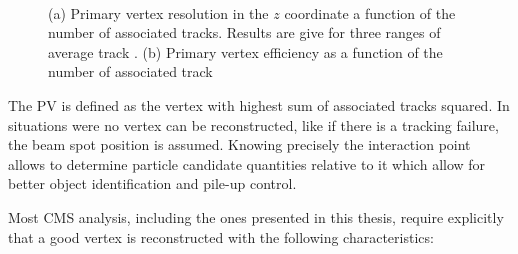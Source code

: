 \begin{figure}[htp]%
\centering
{}\qquad
{}\\
\caption[Primary vertex resolution in the $z$ coordinate and vertex reconstruction efficiency as a function of the number of constituent tracks.]{(a) Primary vertex resolution in the $z$ coordinate a function of the number of associated tracks. Results are give for three ranges of average track \pt. (b) Primary vertex efficiency as a function of the number of associated track \cite{ARTICLE:CMSTrackingAndPrimaryVertex}}
\label{FIGURE:EventReconstructionPhysicsObjects_Vertex}
\end{figure}

The \gls{PV} is defined as the vertex with highest sum of associated tracks \pt squared. In situations were no vertex can be reconstructed, like if there is a tracking failure, the beam spot position is assumed. Knowing precisely the interaction point allows to determine particle candidate quantities relative to it which allow for better object identification and pile-up control. 

Most \gls{CMS} analysis, including the ones presented in this thesis, require explicitly that a good vertex is reconstructed with the following characteristics:

